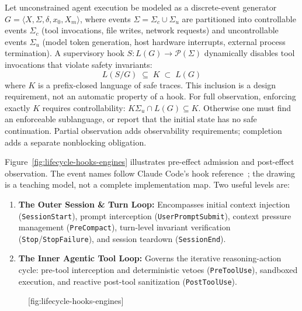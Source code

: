 \documentclass[11pt,a4paper]{article}
\begin{document}
Let unconstrained agent execution be modeled as a discrete-event generator $G = \langle X, \Sigma, \delta, x_0, X_m \rangle$, where events $\Sigma = \Sigma_c \cup \Sigma_u$ are partitioned into controllable events $\Sigma_c$ (tool invocations, file writes, network requests) and uncontrollable events $\Sigma_u$ (model token generation, host hardware interrupts, external process termination). A supervisory hook $S: L(G) \to \mathcal{P}(\Sigma)$ dynamically disables tool invocations that violate safety invariants:
\begin{equation}
L(S / G) \;\subseteq\; K \;\subset\; L(G)
\end{equation}
where $K$ is a prefix-closed language of safe traces. This inclusion is a design requirement, not an automatic property of a hook. For full observation, enforcing exactly $K$ requires controllability: $K\Sigma_u\cap L(G)\subseteq K$. Otherwise one must find an enforceable sublanguage, or report that the initial state has no safe continuation. Partial observation adds observability requirements; completion adds a separate nonblocking obligation.

Figure~\ref{fig:lifecycle-hooks-engines} illustrates pre-effect admission and
post-effect observation. The event names follow Claude Code's hook
reference~; the drawing is a teaching model, not a
complete implementation map. Two useful levels are:
\begin{enumerate}[leftmargin=1.8em,itemsep=2pt]
  \item \textbf{The Outer Session \& Turn Loop:} Encompasses initial context injection (\texttt{SessionStart}), prompt interception (\texttt{UserPromptSubmit}), context pressure management (\texttt{PreCompact}), turn-level invariant verification (\texttt{Stop}/\texttt{StopFailure}), and session teardown (\texttt{SessionEnd}).
  \item \textbf{The Inner Agentic Tool Loop:} Governs the iterative reasoning-action cycle: pre-tool interception and deterministic vetoes (\texttt{PreToolUse}), sandboxed execution, and reactive post-tool sanitization (\texttt{PostToolUse}).
\end{enumerate}

\begin{figure}[tp]
  \centering
  [fig:lifecycle-hooks-engines]
\end{figure}
\end{document}
